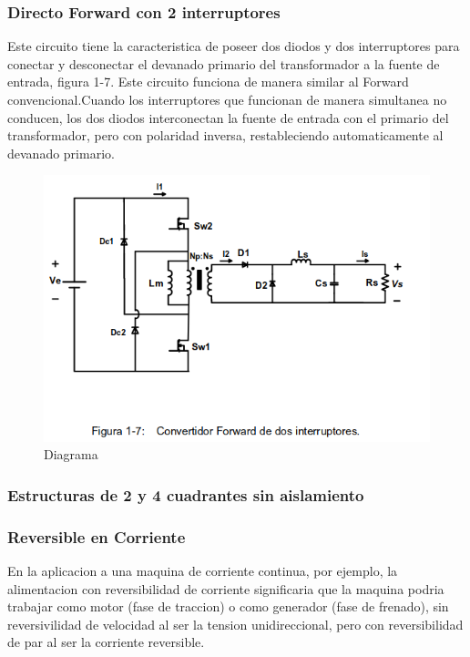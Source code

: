 \documentclass[11pt]{article}
\begin{document}
\subsubsection{Directo Forward con 2 interruptores}
Este   circuito   tiene   la   caracteristica   de   poseer   dos   diodos   y   dos   interruptores    para    conectar    y    desconectar    el    devanado    primario    del    transformador  a  la  fuente  de  entrada,  figura  1-7.  Este  circuito  funciona  de  manera similar al Forward convencional.Cuando   los   interruptores   que   funcionan   de   manera   simultanea   no   conducen, los dos diodos interconectan la fuente de entrada con el primario del transformador,  pero  con  polaridad  inversa,  restableciendo  automaticamente  al  devanado primario.
\begin{figure}[htp]
\centering
\includegraphics[scale=0.31]{Con 2 interruptores.png}
\caption{Diagrama}
\label{}
\end{figure}
\subsubsection{Estructuras de 2 y 4 cuadrantes sin aislamiento}
\subsubsection{Reversible en Corriente}
En la aplicacion a una maquina de corriente continua, por ejemplo, la alimentacion con reversibilidad de corriente significaria que la maquina podria trabajar como motor (fase de traccion) o como generador (fase de frenado), sin reversivilidad de velocidad al ser la tension unidireccional, pero con reversibilidad de par al ser la corriente reversible.
\end{document}

